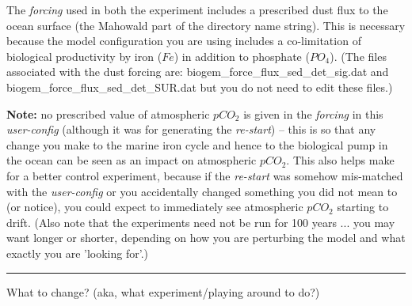 \vspace{1mm}
The \textit{forcing} used in both the experiment includes a prescribed dust flux to the ocean surface (the \textsf{\footnotesize Mahowald} part of the directory name string). This is necessary because the model configuration you are using includes a co-limitation of biological productivity by iron (\(Fe\)) in addition to phosphate (\(PO_{4}\)). (The files associated with the dust forcing are: \textsf{\footnotesize biogem\_force\_flux\_sed\_det\_sig.dat} and \textsf{\footnotesize biogem\_force\_flux\_sed\_det\_SUR.dat} but you do not need to edit these files.)

\newpage

\noindent \textbf{Note:} no prescribed value of atmospheric \(pCO_{2}\) is given in the \textit{forcing} in this \textit{user-config} (although it was for generating the \textit{re-start}) -- this is so that any change you make to the marine iron cycle and hence to the biological pump in the ocean can be seen as an impact on atmospheric \(pCO_{2}\). This also helps make for a better control experiment, because if the \textit{re-start} was somehow mis-matched with the \textit{user-config} or you accidentally changed something you did not mean to (or notice), you could expect to immediately see atmospheric \(pCO_{2}\) starting to drift. (Also note that the experiments need not be run for 100 years ... you may want longer or shorter, depending on how you are perturbing the model and what exactly you are 'looking for'.)

\vspace{1mm} \noindent\rule{4cm}{0.1mm} \vspace{2mm}

\noindent What to change? (aka, what experiment/playing around to do?)

